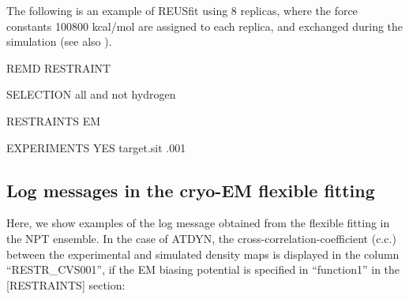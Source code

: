 \documentclass[a4paper,11pt,oneside,english]{sphinxmanual}
\begin{document}
The following is an example of REUSfit using 8 replicas,
where the force constants 100\textendash{}800 kcal/mol are assigned to each replica,
and exchanged during the simulation (see also {\hyperref[\detokenize{14_REMD:remd}]{}}).

\begin{sphinxVerbatim}[commandchars=\\\{\}]
\PYG{o}{[}REMD\PYG{o}{]}
        
  
            RESTRAINT
        
   

\PYG{o}{[}SELECTION\PYG{o}{]}
           all and not hydrogen

\PYG{o}{[}RESTRAINTS\PYG{o}{]}
       
        EM
               
    

\PYG{o}{[}EXPERIMENTS\PYG{o}{]}
            YES
     target.sit
      
  .001
     
\end{sphinxVerbatim}


\subsection{Log messages in the cryo-EM flexible fitting}
\label{\detokenize{19_Experiments:log-messages-in-the-cryo-em-flexible-fitting}}
Here, we show examples of the log message obtained from the flexible fitting
in the NPT ensemble. In the case of ATDYN, the cross-correlation-coefficient (c.c.)
between the experimental and simulated density maps is displayed in the column “RESTR\_CVS001”,
if the EM biasing potential is specified in “function1” in the {[}RESTRAINTS{]} section:
\end{document}
